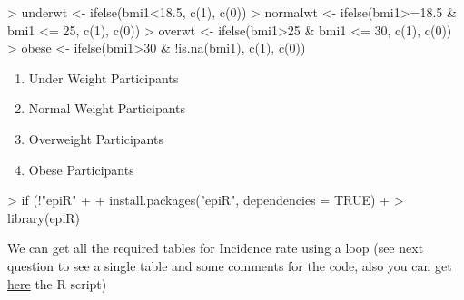 \documentclass{article}
\begin{document}
\begin{Schunk}
\begin{Sinput}
> underwt <- ifelse(bmi1<18.5, c(1), c(0)) 
> normalwt <- ifelse(bmi1>=18.5 & bmi1 <= 25, c(1), c(0))
> overwt <- ifelse(bmi1>25 & bmi1 <= 30, c(1), c(0))
> obese <- ifelse(bmi1>30 & !is.na(bmi1), c(1), c(0))
\end{Sinput}
\end{Schunk}


\begin{enumerate}
  \item 
Under Weight Participants
\item 
Normal Weight Participants
\item 
Overweight Participants
\item
Obese Participants
\end{enumerate}

\begin{Schunk}
\begin{Sinput}
> if (!"epiR" %in% installed.packages())
+ {
+   install.packages("epiR", dependencies = TRUE)
+ }
> library(epiR)
\end{Sinput}
\end{Schunk}
We can get all the required tables for Incidence rate using a loop (see next question to see a single table and some comments for the code, also you can get \href{https://github.com/friveroll/PH207x/blob/master/Week3/Homework3.R}{here} the R script)
\end{document}
